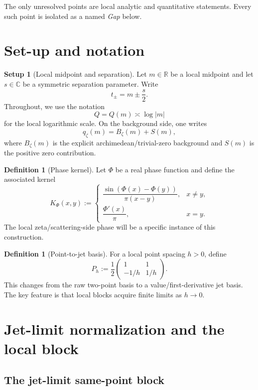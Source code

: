 \documentclass[11pt]{article}
\theoremstyle{plain}
\theoremstyle{definition}
\newtheorem{definition}[theorem]{Definition}
\newtheorem{setup}[theorem]{Setup}
\newcommand{\Qloc}{Q}
\newcommand{\abs}[1]{\left\lvert #1\right\rvert}
\begin{document}
The only unresolved points are local analytic and quantitative statements. Every such point is isolated as a named \emph{Gap} below.

\section{Set-up and notation}

\begin{setup}[Local midpoint and separation]
Let $m\in \mathbb{R}$ be a local midpoint and let $s\in \mathbb{C}$ be a symmetric separation parameter. Write
\[
t_\pm = m \pm \frac{s}{2}.
\]
Throughout, we use the notation
\[
\Qloc=\Qloc(m)\asymp \log \abs{m}
\]
for the local logarithmic scale. On the background side, one writes
\[
q_\zeta(m)=B_\zeta(m)+S(m),
\]
where $B_\zeta(m)$ is the explicit archimedean/trivial-zero background and $S(m)$ is the positive zero contribution.
\end{setup}

\begin{definition}[Phase kernel]
Let $\Phi$ be a real phase function and define the associated kernel
\[
K_\Phi(x,y):=
\begin{cases}
\dfrac{\sin(\Phi(x)-\Phi(y))}{\pi(x-y)}, & x\neq y,\\[1ex]
\dfrac{\Phi'(x)}{\pi}, & x=y.
\end{cases}
\]
The local zeta/scattering-side phase will be a specific instance of this construction.
\end{definition}

\begin{definition}[Point-to-jet basis]
For a local point spacing $h>0$, define
\[
P_h:=\frac12\begin{pmatrix}1&1\\ -1/h&1/h\end{pmatrix}.
\]
This changes from the raw two-point basis to a value/first-derivative jet basis. The key feature is that local blocks acquire finite limits as $h\to 0$.
\end{definition}

\section{Jet-limit normalization and the local block}

\subsection{The jet-limit same-point block}
\end{document}
